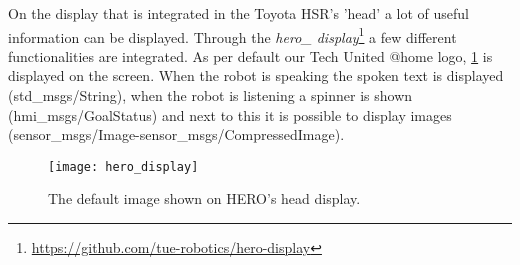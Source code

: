 \label{ssec:display}
On the display that is integrated in the Toyota HSR's 'head' a lot of useful information can be displayed. Through the \emph{hero\_ display}\footnote{\url{https://github.com/tue-robotics/hero-display}} a few different functionalities are integrated. As per default our Tech United @home logo, \ref{fig:hero_display} is displayed on the screen. When the robot is speaking the spoken text is displayed (std\_msgs/String), when the robot is listening a spinner is shown (hmi\_msgs/GoalStatus) and next to this it is possible to display images (sensor\_msgs/Image-sensor\_msgs/CompressedImage).

\begin{figure}[h]
    \centering
	\texttt{[image: hero\_display]}
	\caption{
		The default image shown on HERO's head display.}
	\label{fig:hero_display}
\end{figure}